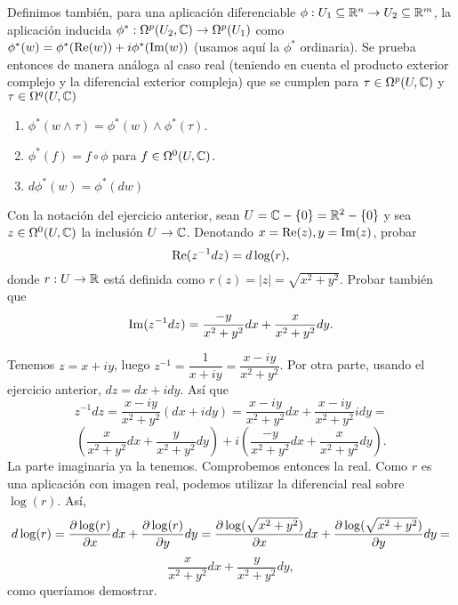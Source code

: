 \documentclass[twoside]{article}
\begin{document}
\begin{solucion}
Definimos también, para una aplicación diferenciable $\phi:U_1\subseteq\mathbb{R}^n\to U_2\subseteq\mathbb{R}^m$, la aplicación inducida $\phi^*:\Omega^p(U_2,\mathbb{C})\to\Omega^p(U_1)$ como $\phi^*(w)=\phi^*(\operatorname{Re}(w))+i\phi^*(\operatorname{Im}(w))$ (usamos aquí la $\phi^*$ ordinaria). Se prueba entonces de manera análoga al caso real (teniendo en cuenta el producto exterior complejo y la diferencial exterior compleja) que se cumplen para $\tau\in\Omega^p(U,\mathbb{C})$ y $\tau\in\Omega^q(U,\mathbb{C})$
\begin{enumerate}
\item $\phi^*(w\land\tau)=\phi^*(w)\land\phi^*(\tau)$.
\item $\phi^*(f)=f\circ\phi$ para $f\in\Omega^0(U,\mathbb{C})$.
\item $d\phi^*(w)=\phi^*(dw)$
\end{enumerate}
\end{solucion}

\newpage

\begin{ejercicio}{3.6}
Con la notación del ejercicio anterior, sean $U=\mathbb{C}-\{0\}=\mathbb{R}^2-\{0\}$ y sea $z\in\Omega^0(U,\mathbb{C})$ la inclusión $U\to\mathbb{C}$. Denotando $x=\operatorname{Re}(z), y=\operatorname{Im}(z)$, probar
\[
\operatorname{Re}(z^{-1}dz)=d\log(r),
\]
donde $r:U\to\mathbb{R}$ está definida como $r(z)=|z|=\sqrt{x^2+y^2}$. Probar también que
\[
\operatorname{Im}(z^{-1}dz)=\frac{-y}{x^2+y^2}dx+\frac{x}{x^2+y^2}dy.
\]
\end{ejercicio}
\begin{solucion}
Tenemos $z=x+iy$, luego $z^{-1}=\dfrac{1}{x+iy}=\dfrac{x-iy}{x^2+y^2}$. Por otra parte, usando el ejercicio anterior, $dz=dx+idy$. Así que 
\[
z^{-1}dz=\dfrac{x-iy}{x^2+y^2}(dx+idy)=\dfrac{x-iy}{x^2+y^2}dx+\dfrac{x-iy}{x^2+y^2}idy=
\]
\[
\left(\dfrac{x}{x^2+y^2}dx+\dfrac{y}{x^2+y^2}dy\right)+i\left(\frac{-y}{x^2+y^2}dx+\frac{x}{x^2+y^2}dy\right).
\]
La parte imaginaria ya la tenemos. Comprobemos entonces la real. Como $r$ es una aplicación con imagen real, podemos utilizar la diferencial real sobre $\log(r)$. Así,
\[
d\log(r)=\frac{\partial \log(r)}{\partial x}dx+\frac{\partial \log(r)}{\partial y}dy=\frac{\partial \log(\sqrt{x^2+y^2})}{\partial x}dx+\frac{\partial \log(\sqrt{x^2+y^2})}{\partial y}dy=
\]
\[
\dfrac{x}{x^2+y^2}dx+\dfrac{y}{x^2+y^2}dy,
\]
como queríamos demostrar.
\end{solucion}

\newpage
\end{document}

